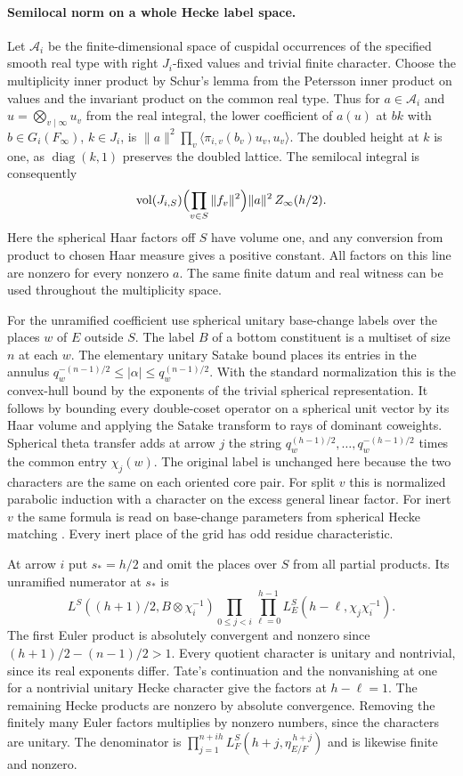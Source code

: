 \paragraph{Semilocal norm on a whole Hecke label space.}
Let \(\mathcal A_i\) be the finite-dimensional space of cuspidal
occurrences of the specified smooth real type with right \(J_i\)-fixed
values and trivial finite character. Choose the multiplicity inner
product by Schur's lemma from the Petersson inner product on values
and the invariant product on the common real type. Thus
for \(a\in\mathcal A_i\) and \(u=\bigotimes_{v\mid\infty}u_v\)
from the real integral, the lower coefficient of \(a(u)\) at \(bk\)
with \(b\in G_i(F_\infty)\), \(k\in J_i\), is
\(\|a\|^2\prod_v\langle\pi_{i,v}(b_v)u_v,u_v\rangle\).
The doubled height at \(k\) is one, as
\(\operatorname{diag}(k,1)\) preserves the doubled lattice.
The semilocal integral is consequently
\[
 \operatorname{vol}(J_{i,S})
      \Bigl(\prod_{v\in S}\|f_v\|^2\Bigr)
      \|a\|^2\,Z_\infty(h/2).
\]
Here the spherical Haar factors off \(S\) have volume one,
and any conversion from product to chosen Haar measure gives
a positive constant. All factors on this line are nonzero for
every nonzero \(a\). The same finite datum and real witness can
be used throughout the multiplicity space.

For the unramified coefficient use spherical unitary base-change
labels over the places \(w\) of \(E\) outside \(S\). The label \(B\)
of a bottom constituent is a multiset of size \(n\) at each \(w\).
The elementary unitary Satake bound places its entries in the
annulus \(q_w^{-(n-1)/2}\le|\alpha|\le q_w^{(n-1)/2}\).
With the standard normalization this is the convex-hull bound by
the exponents of the trivial spherical representation. It follows
by bounding every double-coset operator on a spherical unit vector
by its Haar volume and applying the Satake transform to rays of
dominant coweights. Spherical theta transfer adds at arrow \(j\)
the string \(q_w^{(h-1)/2},\ldots,q_w^{-(h-1)/2}\) times the
common entry \(\chi_j(w)\). The original label is unchanged here
because the two characters are the same on each oriented core
pair. For split \(v\) this is normalized parabolic induction
with a character on the excess general linear factor. For inert
\(v\) the same formula is read on base-change parameters from
spherical Hecke matching \cite[Proposition~A.5]{tr3liu}. Every inert
place of the grid has odd residue characteristic.

At arrow \(i\) put \(s_*=h/2\) and omit the places over \(S\)
from all partial products. Its unramified numerator at \(s_*\)
is
\[
 L^S((h+1)/2,B\otimes\chi_i^{-1})
 \prod_{0\le j<i}\prod_{\ell=0}^{h-1}
         L_E^S(h-\ell,\chi_j\chi_i^{-1}).
\]
The first Euler product is absolutely convergent and nonzero since
\((h+1)/2-(n-1)/2>1\). Every quotient character is unitary and
nontrivial, since its real exponents differ. Tate's continuation
and the nonvanishing at one for a nontrivial unitary Hecke character
give the factors at \(h-\ell=1\). The remaining Hecke products
are nonzero by absolute convergence. Removing the finitely many
Euler factors multiplies by nonzero numbers, since the characters
are unitary. The denominator is
\(\prod_{j=1}^{n+ih}L_F^S(h+j,\eta_{E/F}^{\,h+j})\)
and is likewise finite and nonzero.

